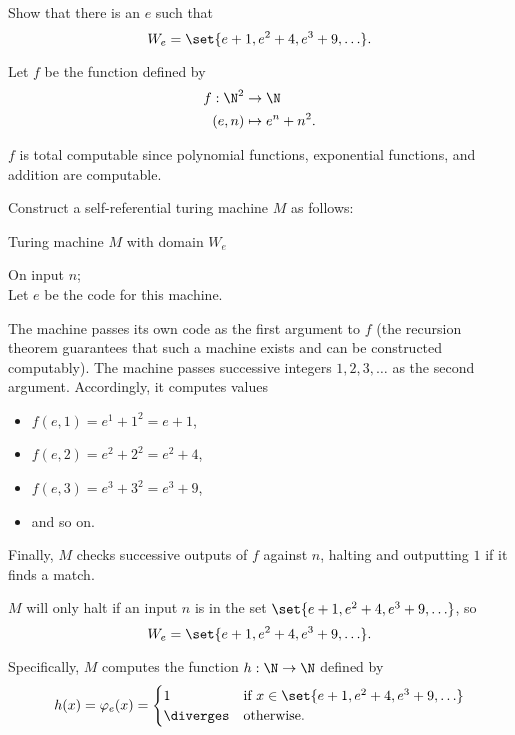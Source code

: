 \begin{problem}
  Show that there is an $e$ such that
  \[
    W_e = \set{ e+1, e^2+4, e^3+9, \ldots }.
  \]

  \begin{answer}
    Let $f$ be the function defined by
    \begin{align*}
      f : \N^2 &\to \N \\
      (e, n) &\mapsto e^n + n^2.
    \end{align*}

    $f$ is total computable since polynomial functions,
    exponential functions, and addition are computable.

    Construct a self-referential turing machine $M$
    as follows:

    \step
    \begin{algorithm}[H]\label{tm:7.1}
      \caption{Turing machine $M$ with domain $W_e$}
      On input $n$; \\
      Let $e$ be the code for this machine. \\
    \end{algorithm}

    \step
    The machine passes its own code as the first argument to $f$
    (the recursion theorem guarantees that such a machine
    exists and can be constructed computably).
    The machine passes successive integers $1, 2, 3, \ldots$ as the second argument.
    Accordingly, it computes values

    \begin{itemize}
      \item $f(e, 1) = e^1 + 1^2 = e+1$,
      \item $f(e, 2) = e^2 + 2^2 = e^2 + 4$,
      \item $f(e, 3) = e^3 + 3^2 = e^3 + 9$,
      \item and so on.
    \end{itemize}

    Finally, $M$ checks successive outputs of $f$ against $n$,
    halting and outputting $1$ if it finds a match.

    $M$ will only halt if an input $n$ is in the set
    $\set{ e+1, e^2+4, e^3+9, \ldots }$,
    so \[ W_e = \set{ e+1, e^2+4, e^3+9, \ldots }. \]

    Specifically, $M$ computes the function $h : \N \to \N$
    defined by
    \[
      h(x) = \varphi_e(x) = \begin{cases}
        1 & \text{if $x \in \set{ e+1, e^2+4, e^3+9, \ldots }$} \\
        \diverges & \text{otherwise}.
      \end{cases}
    \]
  \end{answer}
\end{problem}
